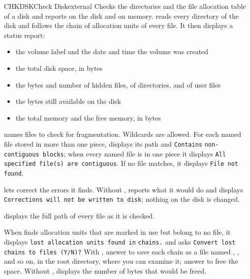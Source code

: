 \begin{DosEntry}{CHKDSK}{Check Disk}{external}
\Purpose Checks the directories and the file allocation table of a disk and
reports on the disk and on memory.
\Format {}
\Remarks
{} reads every directory of the disk and follows the chain of
allocation units of every file.  It then displays a status report:
\begin{itemize}
\item the volume label and the date and time the volume was created
\item the total disk space, in bytes
\item the bytes and number of hidden files, of directories, and of user
  files
\item the bytes still available on the disk
\item the total memory and the free memory, in bytes
\end{itemize}

 names files to check for fragmentation.  Wildcards are
allowed.  For each named file stored in more than one piece, 
displays its path and \texttt{Contains}  \texttt{non-contiguous
blocks}; when every named file is in one piece it displays \texttt{All
specified file(s) are contiguous}.  If no file matches, it displays
\texttt{File not found}.

 lets  correct the errors it finds.  Without
,  reports what it would do and displays
\texttt{Corrections will not be written to disk}; nothing on the disk is
changed.

 displays the full path of every file as it is checked.

When  finds allocation units that are marked in use but belong
to no file, it displays
 \texttt{lost allocation units found in}  \texttt{chains.}
and asks \texttt{Convert lost chains to files (Y/N)?}  With , answer
 to save each chain as a file named ,
, and so on, in the root directory, where you can examine
it; answer  to free the space.  Without , 
displays the number of bytes that would be freed.


\end{DosEntry}
